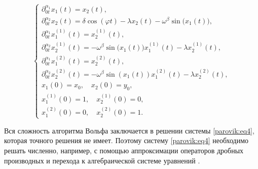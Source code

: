\begin{equation}

\left\{ \begin{array}{l}

\partial _{0t}^{{\alpha _1}}{x_1}( t ) = {x_2}( t ),\\[2mm]

\partial _{0t}^{{\alpha _2}}{x_2}( t ) = \delta \cos \left( {\varphi 	t} \right) - \lambda {x_2}( t ) - {\omega ^\beta }\sin \bigl(

{{x_1}( t )} \bigr),\\[2mm]

\partial _{0t}^{{\alpha _1}}x_1^{(1)}( t ) = x_2^{(1)}( t ),\\[2mm]

\partial _{0t}^{{\alpha _2}}x_2^{(1)}( t ) =  - {\omega ^\beta }\sin

\bigl( {{x_1}( t )} \bigr)x_1^{(1)}( t ) - \lambda

x_2^{(1)}( t ),\\[2mm]

\partial _{0t}^{{\alpha _1}}x_1^{(2)}( t ) = x_2^{(2)}\left( t

\right),\\[2mm]

\partial _{0t}^{{\alpha _2}}x_2^{(2)}( t ) =  - {\omega ^\beta }\sin

\left( {{x_1}( t )} \right)x_1^{(2)}( t ) - \lambda

x_2^{\left( 2 \right)}( t ),\\[2mm]

{x_1}( 0 ) = {x_0}, \quad {x_2}( 0 ) = {y_0},\\[2mm] 

x_1^{(1)}\left( 0 \right) = 1,\quad x_2^{(1)}( 0 ) = 0,\\[2mm] 

x_1^{(2)}( 0 ) = 0,\quad x_2^{(2)}( 0 ) = 1.

\end{array} \right.

\label{parovik:eq4}

\end{equation}



Вся сложность алгоритма Вольфа заключается в решении системы \eqref{parovik:eq4}, которая точного решения не имеет. Поэтому систему \eqref{parovik:eq4} необходимо решать численно, например, с помощью аппроксимации операторов дробных производных и перехода к алгебраической системе уравнений \cite{parovik:18}. 



